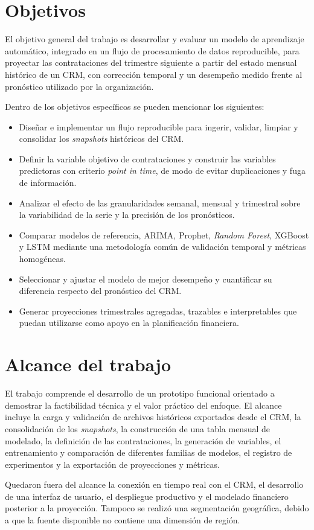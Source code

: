 \section{Objetivos}
\label{sec:objetivos}

El objetivo general del trabajo es desarrollar y evaluar un modelo de aprendizaje automático, integrado en un flujo de procesamiento de datos reproducible, para proyectar las contrataciones del trimestre siguiente a partir del estado mensual histórico de un CRM, con corrección temporal y un desempeño medido frente al pronóstico utilizado por la organización.

Dentro de los objetivos específicos se pueden mencionar los siguientes:

\begin{itemize}
    \item Diseñar e implementar un flujo reproducible para ingerir, validar, limpiar y consolidar los \textit{snapshots} históricos del CRM.
    \item Definir la variable objetivo de contrataciones y construir las variables predictoras con criterio \textit{point in time}, de modo de evitar duplicaciones y fuga de información.
    \item Analizar el efecto de las granularidades semanal, mensual y trimestral sobre la variabilidad de la serie y la precisión de los pronósticos.
    \item Comparar modelos de referencia, ARIMA, Prophet, \textit{Random Forest}, XGBoost y LSTM mediante una metodología común de validación temporal y métricas homogéneas.
    \item Seleccionar y ajustar el modelo de mejor desempeño y cuantificar su diferencia respecto del pronóstico del CRM.
    \item Generar proyecciones trimestrales agregadas, trazables e interpretables que puedan utilizarse como apoyo en la planificación financiera.
\end{itemize}

\section{Alcance del trabajo}
\label{sec:alcanceTrabajo}

El trabajo comprende el desarrollo de un prototipo funcional orientado a demostrar la factibilidad técnica y el valor práctico del enfoque. El alcance incluye la carga y validación de archivos históricos exportados desde el CRM, la consolidación de los \textit{snapshots}, la construcción de una tabla mensual de modelado, la definición de las contrataciones, la generación de variables, el entrenamiento y comparación de diferentes familias de modelos, el registro de experimentos y la exportación de proyecciones y métricas.

Quedaron fuera del alcance la conexión en tiempo real con el CRM, el desarrollo de una interfaz de usuario, el despliegue productivo y el modelado financiero posterior a la proyección. Tampoco se realizó una segmentación geográfica, debido a que la fuente disponible no contiene una dimensión de región.
